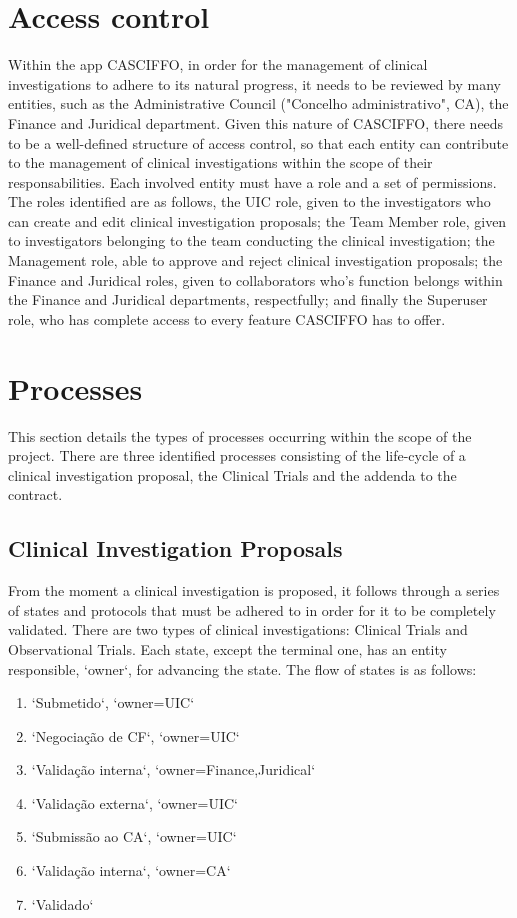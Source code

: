 \section{Access control}
Within the app CASCIFFO, in order for the management of clinical investigations to adhere to its natural progress, it needs to be reviewed by many entities, such as the Administrative Council ("Concelho administrativo", CA), the Finance and Juridical department.
Given this nature of CASCIFFO, there needs to be a well-defined structure of access control, so that each entity can contribute to the management of clinical investigations within the scope of their responsabilities. Each involved entity must have a role and a set of permissions.  
The roles identified are as follows, the UIC role, given to the investigators who can create and edit clinical investigation proposals; the Team Member role, given to investigators belonging to the team conducting the clinical investigation; the Management role, able to approve and reject clinical investigation proposals; the Finance and Juridical roles, given to collaborators who's function belongs within the Finance and Juridical departments, respectfully; and finally the Superuser role, who has complete access to every feature CASCIFFO has to offer.

\section{Processes} 
This section details the types of processes occurring within the scope of the project.  
There are three identified processes consisting of the life-cycle of a clinical investigation proposal, the Clinical Trials and the addenda to the contract. 



\subsection{Clinical Investigation Proposals}
From the moment a clinical investigation is proposed, it follows through a series of states and protocols that must be adhered to in order for it to be completely validated.
There are two types of clinical investigations: Clinical Trials and Observational Trials.  
Each state, except the terminal one, has an entity responsible, `owner`, for advancing the state. 
The flow of states is as follows:  
\begin{enumerate}
    \item `Submetido`, `owner=UIC`
    \item `Negociação de CF`, `owner=UIC`
    \item `Validação interna`, `owner=Finance,Juridical`
    \item `Validação externa`, `owner=UIC`
    \item `Submissão ao CA`, `owner=UIC`
    \item `Validação interna`, `owner=CA`
    \item `Validado`
\end{enumerate}

